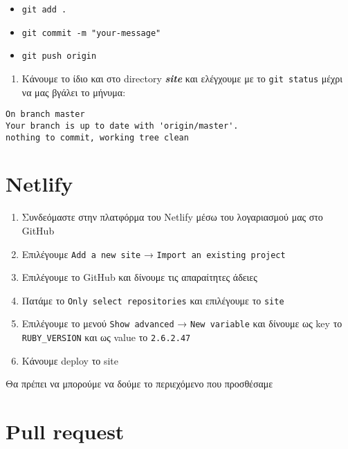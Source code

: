 \begin{itemize}
\tightlist
\item
  \texttt{git\ add\ .}
\item
  \texttt{git\ commit\ -m\ "your-message"}
\item
  \texttt{git\ push\ origin}
\end{itemize}

\begin{enumerate}
\def\labelenumi{\arabic{enumi}.}
\setcounter{enumi}{14}
\tightlist
\item
  Κάνουμε το ίδιο και στο directory \textbf{\emph{site}} και ελέγχουμε
  με το \texttt{git\ status} μέχρι να μας βγάλει το μήνυμα:
\end{enumerate}

\begin{verbatim}
On branch master
Your branch is up to date with 'origin/master'.
nothing to commit, working tree clean
\end{verbatim}

\hypertarget{netlify}{%
\section{Netlify}\label{netlify}}

\begin{enumerate}
\def\labelenumi{\arabic{enumi}.}
\tightlist
\item
  Συνδεόμαστε στην πλατφόρμα του Netlify μέσω του λογαριασμού μας στο
  GitHub
\item
  Επιλέγουμε \texttt{Add\ a\ new\ site} →
  \texttt{Import\ an\ existing\ project}
\item
  Επιλέγουμε το GitHub και δίνουμε τις απαραίτητες άδειες
\item
  Πατάμε το \texttt{Only\ select\ repositories} και επιλέγουμε το
  \texttt{site}
\item
  Επιλέγουμε το μενού \texttt{Show\ advanced} → \texttt{New\ variable}
  και δίνουμε ως key το \texttt{RUBY\_VERSION} και ως value το
  \texttt{2.6.2.47}
\item
  Κάνουμε deploy το site
\end{enumerate}

Θα πρέπει να μπορούμε να δούμε το περιεχόμενο που προσθέσαμε

\hypertarget{pull-request}{%
\section{Pull request}\label{pull-request}}

